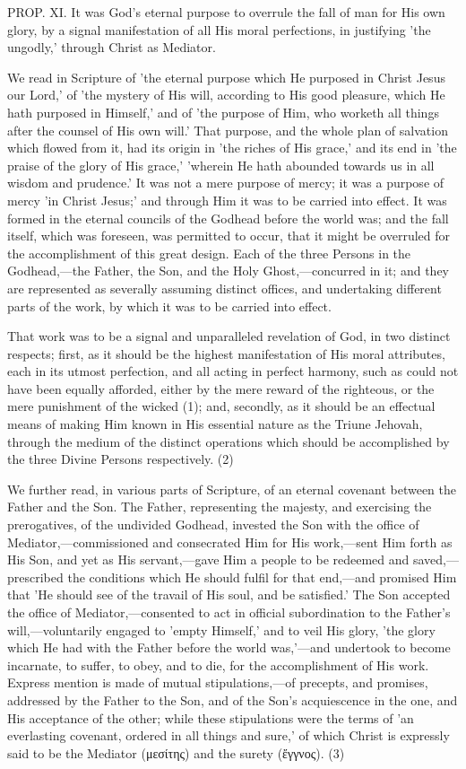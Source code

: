 \documentclass[
]{book}
\begin{document}
PROP. XI. It was God's eternal purpose to overrule the fall of man for His own glory, by a signal manifestation of all His moral perfections, in justifying 'the ungodly,' through Christ as Mediator.

We read in Scripture of 'the eternal purpose which He purposed in Christ Jesus our Lord,' of 'the mystery of His will, according to His good pleasure, which He hath purposed in Himself,' and of 'the purpose of Him, who worketh all things after the counsel of His own will.' That purpose, and the whole plan of salvation which flowed from it, had its origin in 'the riches of His grace,' and its end in 'the praise of the glory of His grace,' 'wherein He hath abounded towards us in all wisdom and prudence.' It was not a mere purpose of mercy; it was a purpose of mercy 'in Christ Jesus;' and through Him it was to be carried into effect. It was formed in the eternal councils of the Godhead before the world was; and the fall itself, which was foreseen, was permitted to occur, that it might be overruled for the accomplishment of this great design. Each of the three Persons in the Godhead,---the Father, the Son, and the Holy Ghost,---concurred in it; and they are represented as severally assuming distinct offices, and undertaking different parts of the work, by which it was to be carried into effect.

That work was to be a signal and unparalleled revelation of God, in two distinct respects; first, as it should be the highest manifestation of His moral attributes, each in its utmost perfection, and all acting in perfect harmony, such as could not have been equally afforded, either by the mere reward of the righteous, or the mere punishment of the wicked (1); and, secondly, as it should be an effectual means of making Him known in His essential nature as the Triune Jehovah, through the medium of the distinct operations which should be accomplished by the three Divine Persons respectively. (2)

We further read, in various parts of Scripture, of an eternal covenant between the Father and the Son. The Father, representing the majesty, and exercising the prerogatives, of the undivided Godhead, invested the Son with the office of Mediator,---commissioned and consecrated Him for His work,---sent Him forth as His Son, and yet as His servant,---gave Him a people to be redeemed and saved,---prescribed the conditions which He should fulfil for that end,---and promised Him that 'He should see of the travail of His soul, and be satisfied.' The Son accepted the office of Mediator,---consented to act in official subordination to the Father's will,---voluntarily engaged to 'empty Himself,' and to veil His glory, 'the glory which He had with the Father before the world was,'---and undertook to become incarnate, to suffer, to obey, and to die, for the accomplishment of His work. Express mention is made of mutual stipulations,---of precepts, and promises, addressed by the Father to the Son, and of the Son's acquiescence in the one, and His acceptance of the other; while these stipulations were the terms of 'an everlasting covenant, ordered in all things and sure,' of which Christ is expressly said to be the Mediator (μεσίτης) and the surety (ἔγγνος). (3)
\end{document}
